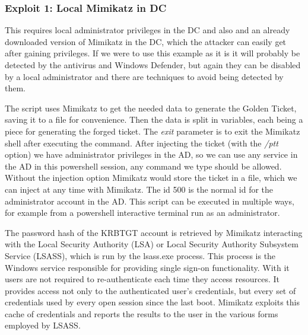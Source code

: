 \subsubsection{Exploit 1: Local Mimikatz in DC}
This requires local administrator privileges in the DC and also and an already downloaded version of Mimikatz in the DC, which the attacker can easily get after gaining privileges. If we were to use this example as it is it will probably be detected by the antivirus and Windows Defender, but again they can be disabled by a local administrator and there are techniques to avoid being detected by them.
\linej

\linej
The script uses Mimikatz to get the needed data to generate the Golden Ticket, saving it to a file for convenience. Then the data is split in variables, each being a piece for generating the forged ticket. The \textit{exit} parameter is to exit the Mimikatz shell after executing the command.
\linej
After injecting the ticket (with the \textit{/ptt} option) we have administrator privileges in the AD, so we can use any service in the AD in this powershell session, any command we type should be allowed. Without the injection option Mimikatz would store the ticket in a file, which we can inject at any time with Mimikatz.
The id 500 is the normal id for the administrator account in the AD.
This script can be executed in multiple ways, for example from a powershell interactive terminal run as an administrator.
\linej

\linej
The password hash of the KRBTGT account is retrieved by Mimikatz interacting with the Local Security Authority (LSA) or Local Security Authority Subsystem Service (LSASS), which is run by the lsass.exe process.
\linej
This process is the Windows service responsible for providing single sign-on functionality.
With it users are not required to re-authenticate each time they access resources.
It provides access not only to the authenticated user's credentials, but every set of credentials used by every open session since the last boot.
\linej
Mimikatz exploits this cache of credentials and reports the results to the user in the various forms employed by LSASS\cite{SANS_mimikatz}\cite{wikipedia_lsass}\cite{pentestlab}\cite{lsadump_patch_inject}\cite{dump_ways}.

